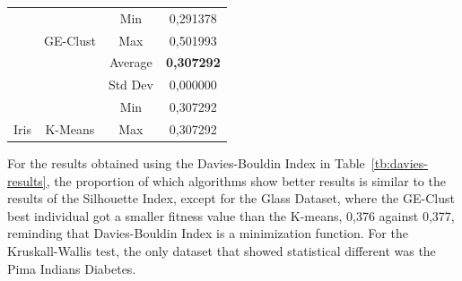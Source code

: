 \documentclass[conference]{IEEEtran}
\begin{document}
\begin{table}[]
\begin{tabular}{|c|c|c|c|}
			&                            & Min                 & 0,291378          \\ \cline{3-4} 
			& \multirow{-4}{*}{GE-Clust} & Max                 & 0,501993          \\ \cline{2-4} 
			&                            & Average             & \textbf{0,307292} \\ \cline{3-4} 
			&                            & Std Dev             & 0,000000          \\ \cline{3-4} 
			&                            & Min                 & 0,307292          \\ \cline{3-4} 
			\multirow{-8}{*}{Iris}                                                                                    & \multirow{-4}{*}{K-Means}  & Max                 & 0,307292          \\ \hline
		\end{tabular}
	\end{table}
	
	
	For the results obtained using the Davies-Bouldin Index in Table~\ref{tb:davies-results}, the proportion of which algorithms show better results is similar to the results of the Silhouette Index, except for the Glass Dataset, where the GE-Clust best individual got a smaller fitness value than the K-means, 0,376 against 0,377, reminding that Davies-Bouldin Index is a minimization function. For the Kruskall-Wallis test, the only dataset that showed statistical different was the Pima Indians Diabetes.
	
\end{document}
